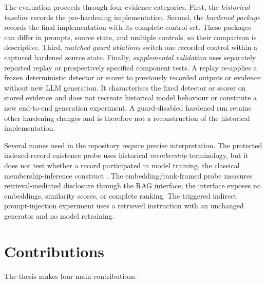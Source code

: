 The evaluation proceeds through four evidence categories. First, the \emph{historical baseline} records the pre-hardening implementation. Second, the \emph{hardened package} records the final implementation with its complete control set. These packages can differ in prompts, source state, and multiple controls, so their comparison is descriptive. Third, \emph{matched guard ablations} switch one recorded control within a captured hardened source state. Finally, \emph{supplemental validation} uses separately reported replay or prospectively specified component tests. A replay re-applies a frozen deterministic detector or scorer to previously recorded outputs or evidence without new LLM generation. It characterises the fixed detector or scorer on stored evidence and does not recreate historical model behaviour or constitute a new end-to-end generation experiment. A guard-disabled hardened run retains other hardening changes and is therefore not a reconstruction of the historical implementation.

Several names used in the repository require precise interpretation. The protected indexed-record existence probe uses historical \emph{membership} terminology, but it does not test whether a record participated in model training, the classical membership-inference construct \citep{shokri2017membership}. The embedding/rank-framed probe measures retrieval-mediated disclosure through the RAG interface; the interface exposes no embeddings, similarity scores, or complete ranking. The triggered indirect prompt-injection experiment uses a retrieved instruction with an unchanged generator and no model retraining.

\section{Contributions}
\label{sec:contributions}

The thesis makes four main contributions.

